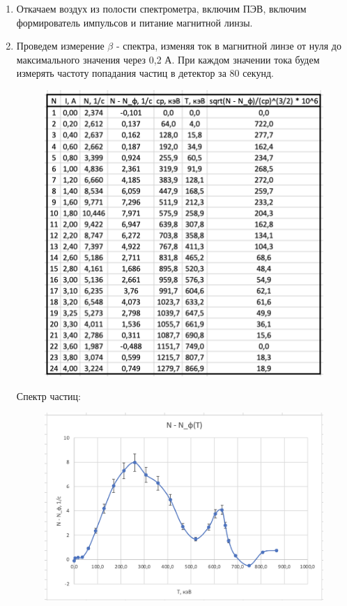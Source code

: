 \documentclass[a4paper, 12pt]{article}%
\begin{document}
\begin{enumerate}

	\item Откачаем воздух из полости спектрометра,  включим ПЭВ,  включим формирователь импульсов и питание магнитной линзы.
	
	\item Проведем измерение $\beta$ - спектра,  изменяя ток в магнитной линзе от нуля до максимального значения через 0,2 А. При каждом значении тока будем измерять частоту попадания частиц в детектор за 80 секунд.
	
\newpage

	\begin{figure}[h!]
	    \centering
		\includegraphics[scale=0.9]{Таблица_1.PNG}
	\end{figure}	

	Спектр частиц:

	\begin{figure}[h!]
	    \centering
		\includegraphics[scale=0.9]{График_1.PNG}
	\end{figure}	


\end{enumerate}
\end{document}
